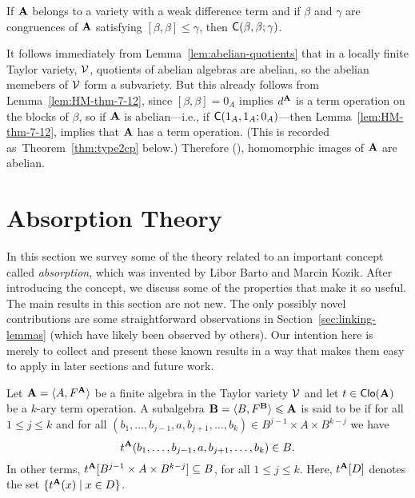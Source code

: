 \begin{lemma}
  \label{lem:KK-lem-6-8}
  If $\mathbf{A}$ belongs to a variety with a
  weak difference term and if $\beta$ and $\gamma$ are congruences of $\mathbf{A}$
  satisfying $[\beta, \beta] \leq \gamma$, then $\mathsf{C}(\beta, \beta; \gamma)$.
\end{lemma}
\begin{remark}
  \label{rem:abelian-quotients}
  It follows immediately from Lemma~\ref{lem:abelian-quotients} that in a locally
  finite Taylor variety, $\mathcal{V}$, quotients of abelian algebras are abelian, so the
  abelian memebers of $\mathcal{V}$ form a subvariety.
  But this already follows from Lemma~\ref{lem:HM-thm-7-12},
  since $[\beta, \beta] = 0_A$ implies $d^{\mathbf{A}}$ is a \malcev term operation on
  the blocks of $\beta$, so if $\mathbf{A}$ is abelian---i.e., if
  $\mathsf{C}(1_A, 1_A; 0_A)$---then Lemma~\ref{lem:HM-thm-7-12},
  implies that $\mathbf{A}$ has a \malcev term operation.
  (This is recorded as~Theorem~\ref{thm:type2cp} below.)
  Therefore (\cite[Cor~7.28]{MR2839398}), homomorphic images of $\mathbf{A}$ are
  abelian. 
\end{remark}



\section{Absorption Theory}
\label{sec:absorption}
In this section we survey some of the theory related to 
an important concept called \emph{absorption}, which was invented
by Libor Barto and Marcin Kozik. After introducing the concept, we discuss some of the properties that make it
so useful. 
The main results in this section are not new. The only possibly novel contributions are some
straightforward observations in Section~\ref{sec:linking-lemmas} (which have likely been
observed by others). Our intention here is merely to collect and present these
known results in a way that makes them easy to apply in later sections and future work.

Let $\mathbf{A} = \langle A, F^{\mathbf{A}}\rangle$ be a finite algebra in the Taylor variety $\mathcal{V}$ 
and let $t\in \operatorname{\mathsf{Clo}}(\mathbf{A})$ be a $k$-ary term operation.
A subalgebra  $\mathbf{B} = \langle B, F^{\mathbf{B}}\rangle \leqslant \mathbf{A}$ is said to be 
 if
for all $1\leq j\leq k$ and for all 
$(b_1, \dots, b_{j-1}, a, b_{j+1}, \dots, b_k)\in B^{j-1}\times A \times B^{k-j}$
we have
\[
t^{\mathbf{A}}(b_1, \dots, b_{j-1}, a, b_{j+1}, \dots, b_k)\in B.
\]
In other terms,
$t^{\mathbf{A}}[B^{j-1}\times A \times B^{k-j}] \subseteq B$,
for all $1\leq j \leq k$.
Here, $t^{\mathbf{A}}[D]$ denotes the set $\{ t^{\mathbf{A}}(x) \mid x\in D \}$.

